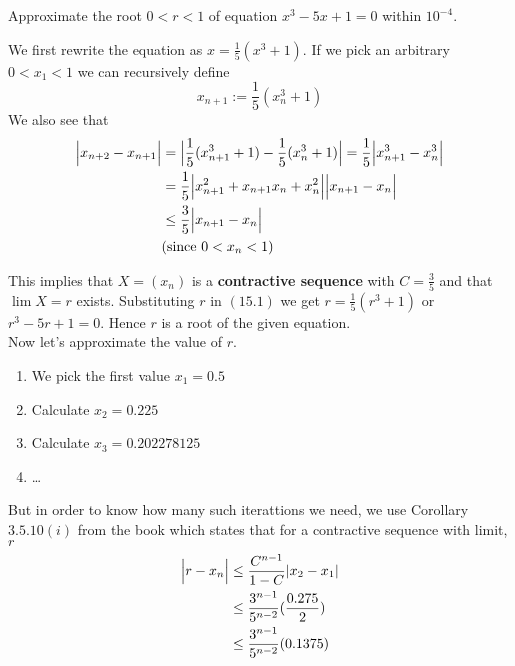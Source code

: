 \documentclass[boxes, qed]{homework}
\DeclarePairedDelimiter\abs{\lvert}{\rvert}
\begin{document}
\newenvironment{amatrix}[1]{%
  \left[\begin{array}{@{}*{#1}{c}|c@{}}
}{%
  \end{array}\right]
}

\newenvironment{augmatrix}[1]{%
  \left[\begin{array}{#1}
}{%
  \end{array}\right]
}
\begin{problem}Approximate the root $0<r<1$ of equation
  $x^3-5x+1=0$ within $10^{-4}$.
\end{problem}
\begin{solution}We first rewrite the equation as $x=\frac{1}{5}(x^3+1)$.
  If we pick an arbitrary $0<x_1<1$ we can recursively define
  \begin{equation}
    x_{n+1}:=\frac{1}{5}(x_n^3+1)
  \end{equation}
  We also see that
  \begin{align*}
    \abs[\Big]{x_{n+2}-x_{n+1}}
      &=\abs[\Big]{
        \frac{1}{5}(x_{n+1}^3+1)
        -\frac{1}{5}(x_{n}^3+1)
      }
      =\frac{1}{5}
      \abs[\Big]{x_{n+1}^3 - x_{n}^3}\\
      &=\frac{1}{5}
      \abs[\Big]{x_{n+1}^2 + x_{n+1}x_{n} + x_{n}^2}
      \abs[\Big]{x_{n+1}- x_{n}}\\
      &\le\frac{3}{5}\abs[\Big]{x_{n+1}- x_{n}}\\
      &\text{(since $0<x_n<1$)}
  \end{align*}

  This implies that $X=(x_n)$ is a \textbf{contractive sequence} with $C=\frac{3}{5}$
  and that $\lim{X}=r$ exists. Substituting $r$ in $(15.1)$ we get
  $r=\frac{1}{5}(r^3+1)$ or $r^3-5r+1=0$. Hence $r$ is a root of the given equation.\\

  Now let's approximate the value of $r$. 
  \begin{enumerate}
    \item We pick the first value $x_1=0.5$
    \item Calculate $x_2=0.225$
    \item Calculate $x_3=0.202278125$
    \item \dots
  \end{enumerate}
  
  But in order to know how many such iterattions we need, we use Corollary $3.5.10(i)$
  from the book which states that for a contractive sequence with limit, $r$
  \begin{align*}
    \abs[\Big]{r-x_n} 
      &\le \frac{C^{n-1}}{1-C} \abs[Big]{x_2-x_1}\\
      &\le \frac{3^{n-1}}{5^{n-2}} (\frac{0.275}{2})\\
      &\le \frac{3^{n-1}}{5^{n-2}} (0.1375)\\
  \end{align*}


\end{solution}
\end{document}
